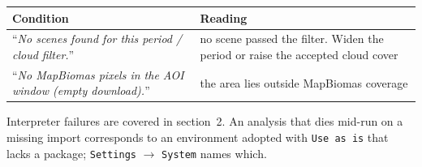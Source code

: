 \documentclass[12pt,a4paper]{article}
\newcommand{\msg}[1]{``\textit{#1}''}
\begin{document}
\begin{center}
\label{tab:runtime}
\small
\renewcommand{\arraystretch}{1.18}
\begin{tabular}{@{}L{7.6cm}L{8.0cm}@{}}
\toprule
\textbf{Condition} & \textbf{Reading} \\
\midrule
\msg{No scenes found for this period / cloud filter.} & no scene passed the filter. Widen the period or raise the accepted cloud cover \\
\msg{No MapBiomas pixels in the AOI window (empty download).} & the area lies outside MapBiomas coverage \\
\bottomrule
\end{tabular}
\end{center}

 Interpreter failures are covered in section~2. An analysis
that dies mid-run on a missing import corresponds to an environment adopted
with \texttt{Use as is} that lacks a package; \texttt{Settings} $\rightarrow$
\texttt{System} names which.
\end{document}

